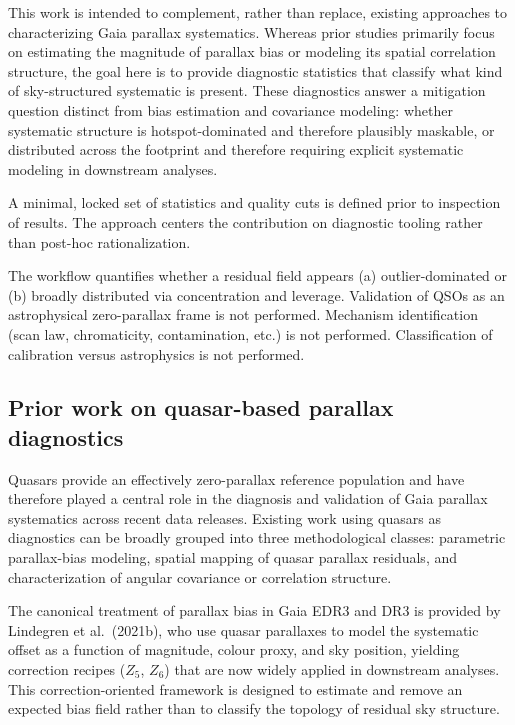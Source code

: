 \documentclass{aa}
\begin{document}
This work is intended to complement, rather than replace, existing approaches to characterizing Gaia parallax systematics. Whereas prior studies primarily focus on estimating the magnitude of parallax bias or modeling its spatial correlation structure, the goal here is to provide diagnostic statistics that classify what kind of sky-structured systematic is present. These diagnostics answer a mitigation question distinct from bias estimation and covariance modeling: whether systematic structure is hotspot-dominated and therefore plausibly maskable, or distributed across the footprint and therefore requiring explicit systematic modeling in downstream analyses.

A minimal, locked set of statistics and quality cuts is defined prior to inspection of results. The approach centers the contribution on diagnostic tooling rather than post-hoc rationalization.

The workflow quantifies whether a residual field appears (a) outlier-dominated or (b) broadly distributed via concentration and leverage. Validation of QSOs as an astrophysical zero-parallax frame is not performed. Mechanism identification (scan law, chromaticity, contamination, etc.) is not performed. Classification of calibration versus astrophysics is not performed.

\subsection{Prior work on quasar-based parallax diagnostics}

Quasars provide an effectively zero-parallax reference population and have therefore played a central role in the diagnosis and validation of Gaia parallax systematics across recent data releases. Existing work using quasars as diagnostics can be broadly grouped into three methodological classes: parametric parallax-bias modeling, spatial mapping of quasar parallax residuals, and characterization of angular covariance or correlation structure.

The canonical treatment of parallax bias in Gaia EDR3 and DR3 is provided by Lindegren et al.\ (2021b), who use quasar parallaxes to model the systematic offset as a function of magnitude, colour proxy, and sky position, yielding correction recipes ($Z_5$, $Z_6$) that are now widely applied in downstream analyses. This correction-oriented framework is designed to estimate and remove an expected bias field rather than to classify the topology of residual sky structure.
\end{document}
